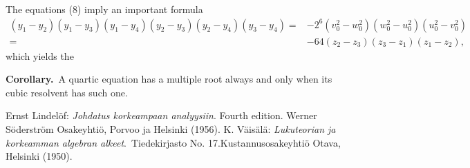 \documentclass[12pt]{article}
\theoremstyle{definition}
\begin{document}
The equations (8) imply an important formula
\begin{align*}
(y_1-y_2)(y_1-y_3)(y_1-y_4)(y_2-y_3)(y_2-y_4)(y_3-y_4) = & -2^6(v_0^2-w_0^2)(w_0^2-u_0^2)(u_0^2-v_0^2)\\ =
& -64(z_2-z_3)(z_3-z_1)(z_1-z_2),
\end{align*}
which yields the

\textbf{Corollary.}\, A quartic equation has a multiple root always and only when its cubic resolvent has such one.


\begin{thebibliography}{9}
 {\sc Ernst Lindel\"of}: {\em Johdatus korkeampaan analyysiin}. Fourth edition. Werner S\"oderstr\"om Osakeyhti\"o, Porvoo ja Helsinki (1956).
 {\sc K. V\"ais\"al\"a}: {\em Lukuteorian ja korkeamman algebran alkeet}.\, Tiedekirjasto No. 17.\quad  Kustannusosakeyhti\"o Otava, Helsinki (1950).

\end{thebibliography}
\end{document}
